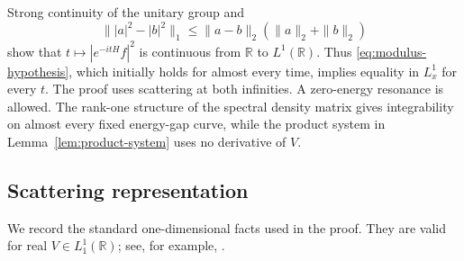 \documentclass[11pt]{amsart}
\numberwithin{equation}{section}
\theoremstyle{remark}
\newcommand{\R}{\mathbb R}
\begin{document}
Strong continuity of the unitary group and
\[
 \||a|^2-|b|^2\|_1
 \le\|a-b\|_2(\|a\|_2+\|b\|_2)
\]
show that $t\mapsto |e^{-itH}f|^2$ is continuous from $\R$ to $L^1(\R)$.
Thus \eqref{eq:modulus-hypothesis}, which initially holds for almost every
time, implies equality in $L^1_x$ for every $t$.  The proof uses scattering at both
infinities.  A zero-energy resonance is allowed.  The rank-one structure of
the spectral density matrix gives integrability on almost every fixed
energy-gap curve, while the product system in
Lemma~\ref{lem:product-system} uses no derivative of $V$.

\subsection{Scattering representation}

We record the standard one-dimensional facts used in the proof.  They are
valid for real $V\in L^1_1(\R)$; see, for example,
\cite{DeiftTrubowitz,EgorovaKopylovaMarchenkoTeschl,TeschlBook}.
\end{document}
